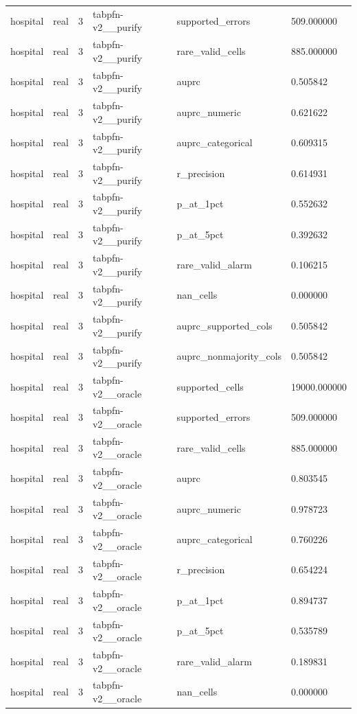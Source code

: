 \begin{tabular}{llllll}
hospital & real & 3 & tabpfn-v2\_\_purify & supported\_errors & 509.000000 \\
hospital & real & 3 & tabpfn-v2\_\_purify & rare\_valid\_cells & 885.000000 \\
hospital & real & 3 & tabpfn-v2\_\_purify & auprc & 0.505842 \\
hospital & real & 3 & tabpfn-v2\_\_purify & auprc\_numeric & 0.621622 \\
hospital & real & 3 & tabpfn-v2\_\_purify & auprc\_categorical & 0.609315 \\
hospital & real & 3 & tabpfn-v2\_\_purify & r\_precision & 0.614931 \\
hospital & real & 3 & tabpfn-v2\_\_purify & p\_at\_1pct & 0.552632 \\
hospital & real & 3 & tabpfn-v2\_\_purify & p\_at\_5pct & 0.392632 \\
hospital & real & 3 & tabpfn-v2\_\_purify & rare\_valid\_alarm & 0.106215 \\
hospital & real & 3 & tabpfn-v2\_\_purify & nan\_cells & 0.000000 \\
hospital & real & 3 & tabpfn-v2\_\_purify & auprc\_supported\_cols & 0.505842 \\
hospital & real & 3 & tabpfn-v2\_\_purify & auprc\_nonmajority\_cols & 0.505842 \\
hospital & real & 3 & tabpfn-v2\_\_oracle & supported\_cells & 19000.000000 \\
hospital & real & 3 & tabpfn-v2\_\_oracle & supported\_errors & 509.000000 \\
hospital & real & 3 & tabpfn-v2\_\_oracle & rare\_valid\_cells & 885.000000 \\
hospital & real & 3 & tabpfn-v2\_\_oracle & auprc & 0.803545 \\
hospital & real & 3 & tabpfn-v2\_\_oracle & auprc\_numeric & 0.978723 \\
hospital & real & 3 & tabpfn-v2\_\_oracle & auprc\_categorical & 0.760226 \\
hospital & real & 3 & tabpfn-v2\_\_oracle & r\_precision & 0.654224 \\
hospital & real & 3 & tabpfn-v2\_\_oracle & p\_at\_1pct & 0.894737 \\
hospital & real & 3 & tabpfn-v2\_\_oracle & p\_at\_5pct & 0.535789 \\
hospital & real & 3 & tabpfn-v2\_\_oracle & rare\_valid\_alarm & 0.189831 \\
hospital & real & 3 & tabpfn-v2\_\_oracle & nan\_cells & 0.000000 \\

\end{tabular}
